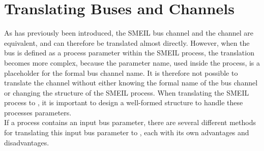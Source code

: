 \section{Translating Buses and Channels}
As has previously been introduced, the SMEIL bus channel and the \cspm{} channel are equivalent, and can therefore be translated almost directly. However, when the bus is defined as a process parameter within the SMEIL process, the translation becomes more complex, because the parameter name, used inside the process, is a placeholder for the formal bus channel name. It is therefore not possible to translate the channel without either knowing the formal name of the bus channel or changing the structure of the SMEIL process.
When translating the SMEIL process to \cspm{}, it is important to design a well-formed structure to handle these processes parameters.\\

If a process contains an input bus parameter, there are several different methods for translating this input bus parameter to \cspm{}, each with its own advantages and disadvantages.\\

